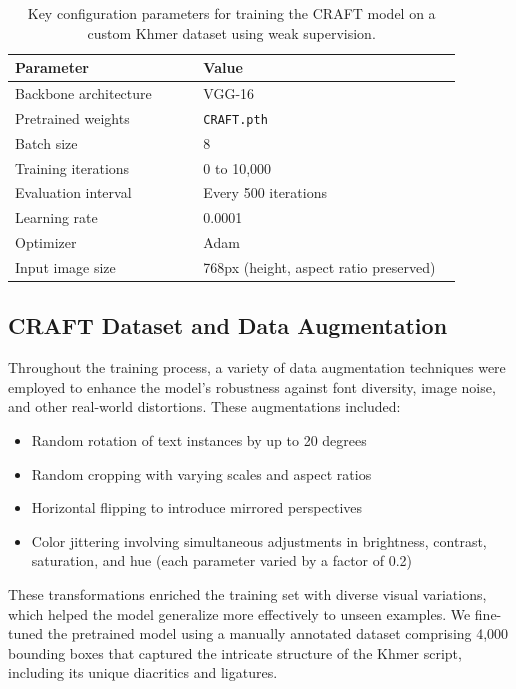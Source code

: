 \begin{table}[H]
\centering
\begin{tabular}{|p{0.4\linewidth}|p{0.55\linewidth}|}
\hline
\textbf{Parameter} & \textbf{Value} \\
\hline
Backbone architecture & VGG-16 \\
Pretrained weights & \texttt{CRAFT.pth} \\
Batch size & 8 \\
Training iterations & 0 to 10,000 \\
Evaluation interval & Every 500 iterations \\
Learning rate & 0.0001 \\
Optimizer & Adam \\
Input image size & 768px (height, aspect ratio preserved) \\
\hline
\end{tabular}
\caption{Key configuration parameters for training the CRAFT model on a custom Khmer dataset 
using weak supervision.}
\label{tab:craft-training-config}
\end{table}

\subsection{CRAFT Dataset and Data Augmentation}
\label{subsec:craft-dataset}

Throughout the training process, a variety of data augmentation techniques 
were employed to enhance the model's robustness against font diversity, 
image noise, and other real-world distortions. These augmentations included:

\begin{itemize}
\item Random rotation of text instances by up to 20 degrees
\item Random cropping with varying scales and aspect ratios
\item Horizontal flipping to introduce mirrored perspectives
\item Color jittering involving simultaneous adjustments in brightness, 
contrast, saturation, and hue (each parameter varied by a factor of 0.2)
\end{itemize}

These transformations enriched the training set with diverse visual variations, 
which helped the model generalize more effectively to unseen examples. 
We fine-tuned the pretrained model using a manually annotated dataset 
comprising 4,000 bounding boxes that captured the intricate structure 
of the Khmer script, including its unique diacritics and ligatures.

